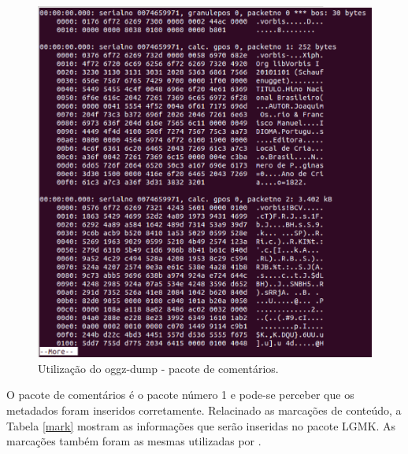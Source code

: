  \begin{figure}[ht]
	\centering
		\includegraphics[keepaspectratio=true,scale=0.3]{figuras/hnbogg.eps}
	\caption{Utilização do oggz-dump - pacote de comentários.}
	\label{meta}
\end{figure}

O pacote de comentários é o pacote número 1 e pode-se perceber que os metadados foram inseridos corretamente. Relacinado as marcações de conteúdo,  a Tabela \ref{mark} mostram as informações que serão inseridas no pacote LGMK. As marcações também foram as mesmas utilizadas por \cite{herbert}.


